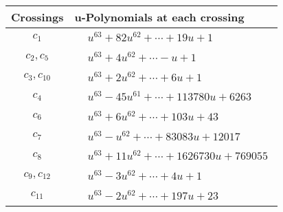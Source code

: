 \documentclass[1p]{elsarticle_modified}
\theoremstyle{definition}
\begin{document}
\begin{tabular}{m{50pt}|m{274pt}}
Crossings & \hspace{64pt}u-Polynomials at each crossing \\
\hline $$\begin{aligned}c_{1}\end{aligned}$$&$\begin{aligned}
&u^{63}+82 u^{62}+\cdots+19 u+1
\end{aligned}$\\
\hline $$\begin{aligned}c_{2},c_{5}\end{aligned}$$&$\begin{aligned}
&u^{63}+4 u^{62}+\cdots- u+1
\end{aligned}$\\
\hline $$\begin{aligned}c_{3},c_{10}\end{aligned}$$&$\begin{aligned}
&u^{63}+2 u^{62}+\cdots+6 u+1
\end{aligned}$\\
\hline $$\begin{aligned}c_{4}\end{aligned}$$&$\begin{aligned}
&u^{63}-45 u^{61}+\cdots+113780 u+6263
\end{aligned}$\\
\hline $$\begin{aligned}c_{6}\end{aligned}$$&$\begin{aligned}
&u^{63}+6 u^{62}+\cdots+103 u+43
\end{aligned}$\\
\hline $$\begin{aligned}c_{7}\end{aligned}$$&$\begin{aligned}
&u^{63}- u^{62}+\cdots+83083 u+12017
\end{aligned}$\\
\hline $$\begin{aligned}c_{8}\end{aligned}$$&$\begin{aligned}
&u^{63}+11 u^{62}+\cdots+1626730 u+769055
\end{aligned}$\\
\hline $$\begin{aligned}c_{9},c_{12}\end{aligned}$$&$\begin{aligned}
&u^{63}-3 u^{62}+\cdots+4 u+1
\end{aligned}$\\
\hline $$\begin{aligned}c_{11}\end{aligned}$$&$\begin{aligned}
&u^{63}-2 u^{62}+\cdots+197 u+23
\end{aligned}$\\
\hline
\end{tabular}\\~\\
\end{document}
